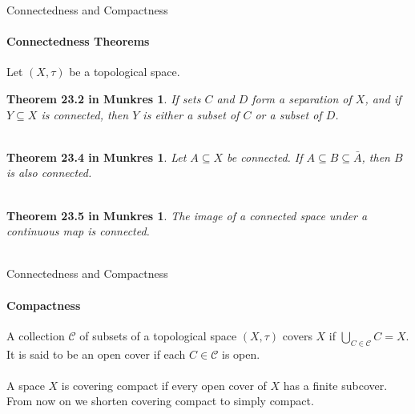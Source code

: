 \documentclass[pdf]{beamer}
\begin{document}
    \begin{frame}{Connectedness and Compactness}
        \framesubtitle{Connectedness Theorems}
        \newtheorem{thrm:entire}{Theorem 23.2 in Munkres}
        \newtheorem{thrm:closure}{Theorem 23.4 in Munkres}
        \newtheorem{thrm:image}{Theorem 23.5 in Munkres}

        Let $(X, \tau)$ be a topological space.

        \begin{thrm:entire}
            If sets $C$ and $D$ form a separation of $X$, and if $Y \subseteq X$ is connected, then
            $Y$ is either a subset of $C$ or a subset of $D$. \\~\\
        \end{thrm:entire}

        \begin{thrm:closure}
            Let $A \subseteq X$ be connected. If $A \subseteq B \subseteq \bar{A}$, then
            $B$ is also connected. \\~\\
        \end{thrm:closure}

        \begin{thrm:image}
            The image of a connected space under a continuous map is connected. \\~\\
        \end{thrm:image}

    \end{frame}

    \begin{frame}{Connectedness and Compactness}
        \framesubtitle{Compactness}

        A collection $\mathcal{C}$ of subsets of a topological space $(X, \tau)$ covers
        $X$ if $\bigcup_{C \in \mathcal{C}} C = X$. It is said to be an {\color{red} open cover}
        if each $C \in \mathcal{C}$ is open. \\~\\

        A space $X$ is {\color{red} covering compact} if every open cover of $X$ has a finite subcover.
        From now on we shorten covering compact to simply compact. \\~\\
        
    \end{frame}
\end{document}

